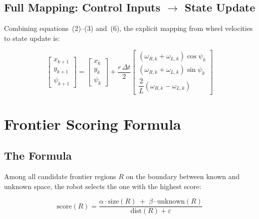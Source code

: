 \documentclass[12pt,a4paper]{article}
\begin{document}
\subsection{Full Mapping: Control Inputs $\to$ State Update}

Combining equations~(2)--(3) and~(6), the explicit mapping from wheel
velocities to state update is:

\begin{equation}
  \begin{bmatrix} x_{k+1} \\ y_{k+1} \\ \psi_{k+1} \end{bmatrix}
  =
  \begin{bmatrix} x_k \\ y_k \\ \psi_k \end{bmatrix}
  +
  \frac{r\,\Delta t}{2}
  \begin{bmatrix}
    (\omega_{R,k}+\omega_{L,k})\cos\psi_k \\
    (\omega_{R,k}+\omega_{L,k})\sin\psi_k \\
    \dfrac{2}{L}(\omega_{R,k}-\omega_{L,k})
  \end{bmatrix}
  \tag{8}
\end{equation}

\newpage
\section{Frontier Scoring Formula}

\subsection{The Formula}

Among all candidate frontier regions $R$ on the boundary between known and
unknown space, the robot selects the one with the highest score:

\begin{equation}
  \text{score}(R)
  = \frac{\alpha \cdot \text{size}(R) \;+\; \beta \cdot \text{unknown}(R)}
         {\text{dist}(R) + \varepsilon}
  \tag{9}
\end{equation}
\end{document}
